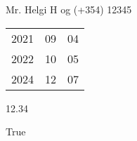 \documentclass[10pt,a4paper]{article}
\begin{document}
	Mr. Helgi H og (+354) 12345

	\begin{tabular}{lll}
		2021 & 09 & 04\\
		2022 & 10 & 05\\
		2024 & 12 & 07
	\end{tabular}


	12.34
	
	
	True
\end{document}
